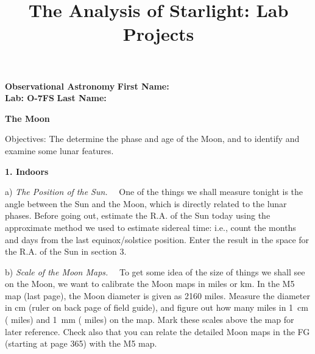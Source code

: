 \documentclass[12pt]{article}
\title{The Analysis of Starlight: Lab Projects}
\begin{document}
\setcounter{page}{1}
\setcounter{equation}{0}
\pagestyle{plain}
\thispagestyle{empty}  %
\newcommand{\kms}{\hbox{km\,s$^{\rm -1}$}}
\def\lo {\ifmmode {\,{\it L}\solar} \else $\,L$\solar\fi}       %
\def\my {\ifmmode {\,{\it M}\solar\,{\rm yr^{-1}}}              %
        \else {$\,M$\solar$\,$yr$^{\rm -1}$}\fi}
\def\BD {BD$\,$+30{\degr}3639}
\def\HUNO{\rm H$\,$I}                   %
\def\HDOS{\rm H$_2$}                    %
\def\arcsec{\ifmmode {^{\scriptscriptstyle\prime\prime}}
          \else $^{\scriptscriptstyle\prime\prime}$\fi}
\def\arcmin{\ifmmode {^{\scriptscriptstyle\prime}}
          \else $^{\scriptscriptstyle\prime}$\fi}
\def\deg{\ifmmode^\circ\else$^\circ$\fi}

\sloppy



\noindent
{\bf Observational Astronomy    \hfill} {\bf First Name:\makebox[4cm]{\hrulefill}}\\
{\bf Lab: O-7FS} \hfill {\bf Last Name:\makebox[4cm]{\hrulefill}}


\bigskip

\medskip

\noindent
{\hfill \Large {\bf The Moon } \hfill}


\bigskip

\noindent
{Objectives:} The determine the phase and age of the Moon, and to
identify and examine some lunar features.


\bigskip
\noindent
{\bf 1. Indoors  }

\medskip\noindent 
a) \emph{The Position of the Sun.} \ \ 
One of the things we shall measure tonight is the angle between the Sun
and the Moon, which is directly related to the lunar phases. Before going
out, estimate the R.A. of the Sun today using the approximate
method we used to estimate sidereal time: i.e., count the months and
days from the last equinox/solstice position. Enter the result in the
space for the R.A. of the Sun in section 3.

\medskip\noindent 
b) \emph{Scale of the Moon Maps.} \ \
To get some idea of the size of things we shall see on the Moon, we want to
calibrate the Moon maps in miles or km. In the M5 map (last page), the
Moon diameter is given as 2160 miles. Measure the diameter in cm (ruler
on back page of field guide), and figure out how many miles in 1~cm
(\makebox[1.5cm]{\hrulefill} miles) and 1~mm (\makebox[1.5
cm]{\hrulefill} miles) on the map. Mark these scales above the map for
later reference. Check also that you can relate the detailed Moon maps
in the FG (starting at page 365) with the M5 map.
\end{document}
